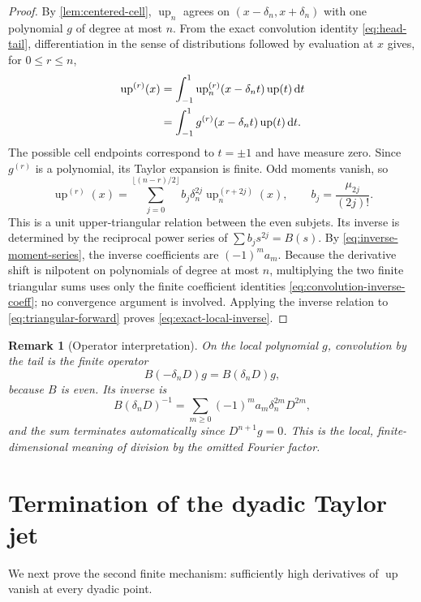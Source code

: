 \documentclass[11pt]{article}
\newtheorem{remark}[theorem]{Remark}
\newcommand{\dd}{\,\mathrm{d}}
\newcommand{\upf}{\operatorname{up}}
\begin{document}
\begin{proof}
By \cref{lem:centered-cell}, \(\upf_n\) agrees on
\((x-\delta_n,x+\delta_n)\) with one polynomial \(g\) of degree at most \(n\).
From the exact convolution identity \cref{eq:head-tail}, differentiation in the
sense of distributions followed by evaluation at \(x\) gives, for
\(0\le r\le n\),
\begin{align}
 \upf^{(r)}(x)
 &=\int_{-1}^{1}\upf_n^{(r)}(x-\delta_n t)\upf(t)\dd t \notag\\
 &=\int_{-1}^{1}g^{(r)}(x-\delta_n t)\upf(t)\dd t.\label{eq:local-convolution-jet}
\end{align}
The possible cell endpoints correspond to \(t=\pm1\) and have measure zero.
Since \(g^{(r)}\) is a polynomial, its Taylor expansion is finite.  Odd moments
vanish, so
\begin{equation}\label{eq:triangular-forward}
 \upf^{(r)}(x)=
 \sum_{j=0}^{\lfloor(n-r)/2\rfloor}
 b_j\delta_n^{2j}\upf_n^{(r+2j)}(x),
 \qquad b_j=\frac{\mu_{2j}}{(2j)!}.
\end{equation}
This is a unit upper-triangular relation between the even subjets.  Its inverse
is determined by the reciprocal power series of \(\sum b_j s^{2j}=B(s)\).
By \cref{eq:inverse-moment-series}, the inverse coefficients are
\((-1)^m a_m\).  Because the derivative shift is nilpotent on polynomials of
degree at most \(n\), multiplying the two finite triangular sums uses only the
finite coefficient identities \cref{eq:convolution-inverse-coeff}; no
convergence argument is involved.  Applying the inverse relation to
\cref{eq:triangular-forward} proves \cref{eq:exact-local-inverse}.
\end{proof}

\begin{remark}[Operator interpretation]
On the local polynomial \(g\), convolution by the tail is the finite operator
\[
 B(-\delta_n D)g=B(\delta_n D)g,
\]
because \(B\) is even.  Its inverse is
\[
 B(\delta_n D)^{-1}
 =\sum_{m\ge0}(-1)^m a_m\delta_n^{2m}D^{2m},
\]
and the sum terminates automatically since \(D^{n+1}g=0\).  This is the local,
finite-dimensional meaning of division by the omitted Fourier factor.
\end{remark}

\section{Termination of the dyadic Taylor jet}

We next prove the second finite mechanism: sufficiently high derivatives of
\(\upf\) vanish at every dyadic point.
\end{document}
